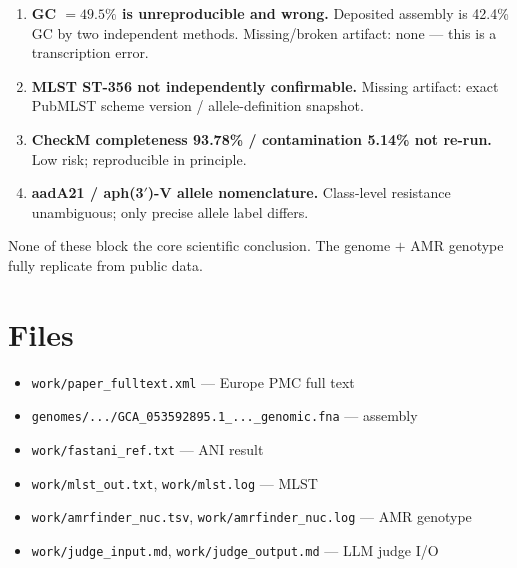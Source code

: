 \documentclass[11pt]{article}
\begin{document}
\begin{enumerate}
  \item \textbf{GC $= 49.5\%$ is unreproducible and wrong.} Deposited assembly is 42.4\% GC by two
        independent methods. Missing/broken artifact: none --- this is a transcription error.

  \item \textbf{MLST ST-356 not independently confirmable.} Missing artifact: exact PubMLST scheme
        version / allele-definition snapshot.

  \item \textbf{CheckM completeness 93.78\% / contamination 5.14\% not re-run.} Low risk; reproducible
        in principle.

  \item \textbf{aadA21 / aph(3$'$)-V allele nomenclature.} Class-level resistance unambiguous; only
        precise allele label differs.
\end{enumerate}

None of these block the core scientific conclusion. The genome $+$ AMR genotype fully replicate from public data.

\section{Files}
\begin{itemize}
  \item \texttt{work/paper\_fulltext.xml} --- Europe PMC full text
  \item \texttt{genomes/.../GCA\_053592895.1\_...\_genomic.fna} --- assembly
  \item \texttt{work/fastani\_ref.txt} --- ANI result
  \item \texttt{work/mlst\_out.txt}, \texttt{work/mlst.log} --- MLST
  \item \texttt{work/amrfinder\_nuc.tsv}, \texttt{work/amrfinder\_nuc.log} --- AMR genotype
  \item \texttt{work/judge\_input.md}, \texttt{work/judge\_output.md} --- LLM judge I/O
\end{itemize}
\end{document}
